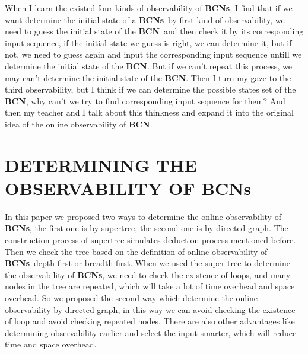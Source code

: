 \documentclass[letterpaper, 10 pt, conference]{ieeeconf}  %
\def \BCN {{\bf BCN}}
\def \BCNs {{\bf BCNs}}
\begin{document}
When I learn the existed four kinds of observability of {\bf BCNs}, I find that if we want determine the initial state of a \BCNs\ by first kind of observability, we need to guess the initial state of the \BCN\ and then check it by its corresponding input sequence, if the initial state we guess is right, we can determine it, but if not, we need to guess again and input the corresponding input sequence untill we determine the initial state of the {\bf BCN}. But if we can't repeat this process, we may can't determine the initial state of the {\bf BCN}. Then I turn my gaze to the third observability, but I think if we can determine the possible states set of the {\bf BCN}, why can't we try to find corresponding input sequence for them? And then my teacher and I talk about this thinkness and expand it into the original idea of the online observability of {\bf BCN}. 
\section{DETERMINING THE OBSERVABILITY OF BCNs}

In this paper we proposed two ways to determine the online observability of {\bf BCNs}, the first one is by supertree, the second one is by directed graph. The construction process of supertree simulates deduction process mentioned before. Then we check the tree based on the definition of online observability of \BCNs\ depth first or breadth first. When we used the super tree to determine the observability of {\bf BCNs}, we need to check the existence of loops, and many nodes in the tree are repeated, which will take a lot of time overhead and space overhead. So we proposed the second way which determine the online observability by directed graph,   in this way we can avoid checking the existence of loop and avoid checking repeated nodes. There are also other advantages like determining observability earlier and select the input smarter, which will reduce time and space overhead.    
\end{document}
